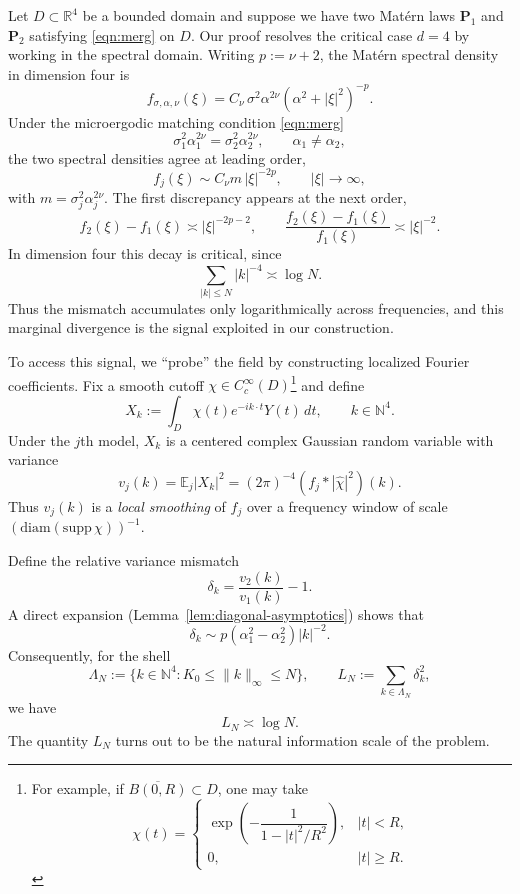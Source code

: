 \documentclass[11pt, reqno]{amsart}
\theoremstyle{remark}
\newcommand{\R}{\mathbb{R}}
\newcommand{\N}{\mathbb{N}}
\newcommand{\E}{\mathbb{E}}
\newcommand{\1}{\mathbf{1}}
\begin{document}
Let $D \subset \R^4$ be a bounded domain and suppose we have two Mat\'ern laws $\mathbf{P}_1$ and $\mathbf{P}_2$ satisfying \eqref{eqn:merg} on $D$. 
Our proof resolves the critical case $d=4$ by working in the spectral domain.
 Writing $p:=\nu+2$, the Mat\'ern spectral density in dimension four is
\[
f_{\sigma,\alpha,\nu}(\xi)
=
C_\nu\,\sigma^2\alpha^{2\nu}(\alpha^2+|\xi|^2)^{-p}.
\]
Under the microergodic matching condition \eqref{eqn:merg}
\[
\sigma_1^2\alpha_1^{2\nu}=\sigma_2^2\alpha_2^{2\nu},
\qquad
\alpha_1\neq\alpha_2,
\]
the two spectral densities agree at leading order,
\[
f_j(\xi)\sim C_\nu m\,|\xi|^{-2p},
\qquad |\xi|\to\infty,
\]
with $m=\sigma_j^2\alpha_j^{2\nu}$.
The first discrepancy appears at the next order,
\[
f_2(\xi)-f_1(\xi)\asymp |\xi|^{-2p-2},
\qquad
\frac{f_2(\xi)-f_1(\xi)}{f_1(\xi)}\asymp |\xi|^{-2}.
\]
In dimension four this decay is critical, since
\[
\sum_{|k|\le N}|k|^{-4}\asymp \log N .
\]
Thus the mismatch accumulates only logarithmically across frequencies, and
this marginal divergence is the signal exploited in our construction.

To access this signal, we ``probe'' the field by constructing localized Fourier coefficients. Fix a smooth cutoff $\chi\in C_c^\infty(D)$\footnote{
For example, if $\overline{B(0,R)}\subset D$, one may take
\[
\chi(t)=
\begin{cases}
\exp\!\left(-\dfrac{1}{1-\lvert t\rvert^2/R^2}\right), & \lvert t\rvert<R,\\[1ex]
0, & \lvert t\rvert\ge R.
\end{cases}
\]
} and define 
\begin{equation}\label{eq:Xk-def}
X_k := \int_D \chi(t)e^{-ik\cdot t}Y(t)\,dt,
\qquad k\in\N^4.
\end{equation}
Under the $j$th model, $X_k$ is a centered complex Gaussian random variable
with variance
\[
v_j(k)=\E_j|X_k|^2
=
(2\pi)^{-4}(f_j*|\widehat{\chi}|^2)(k).
\]
Thus $v_j(k)$ is a \emph{local smoothing} of $f_j$ over a frequency window of scale
$(\mathrm{diam}(\mathrm{supp}\,\chi))^{-1}$.

Define the relative variance mismatch
\begin{equation}\label{eqn:dk}
\delta_k=\frac{v_2(k)}{v_1(k)}-1.
\end{equation}
A direct expansion (Lemma~\ref{lem:diagonal-asymptotics}) shows that
\[
\delta_k \sim p(\alpha_1^2-\alpha_2^2)|k|^{-2}.
\]
Consequently, for the shell
\begin{equation} \label{eqn:Lambda}
\Lambda_N:=\{k\in\mathbb N^4:K_0\le \|k\|_\infty\le N\},
\qquad
L_N:=\sum_{k\in\Lambda_N}\delta_k^2,
\end{equation}
we have
\[
L_N\asymp \log N.
\]
The quantity $L_N$ turns out to be the natural information scale of the problem.
\end{document}
